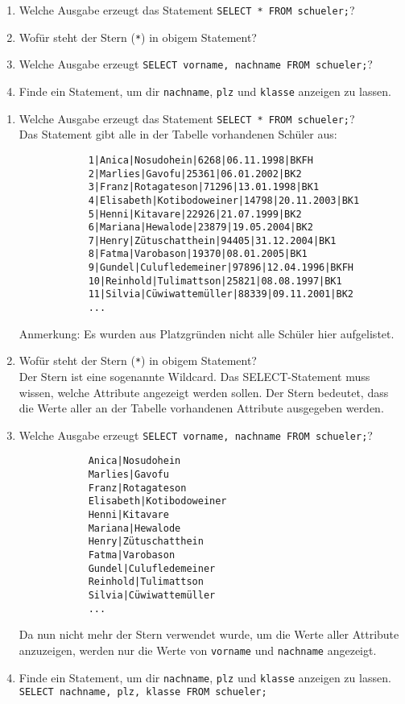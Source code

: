 \begin{Exercise}[title={Beantworte folgende Fragen mit Hilfe deiner Datenbank und dem Internet.}, label=Select]
	\begin{enumerate}
		\item Welche Ausgabe erzeugt das Statement \lstinline!SELECT * FROM schueler;!?
		\item Wofür steht der Stern (\lstinline!*!) in obigem Statement?
		\item Welche Ausgabe erzeugt \lstinline!SELECT vorname, nachname FROM schueler;!?
		\item Finde ein Statement, um dir \lstinline!nachname!, \lstinline!plz! und \lstinline!klasse! anzeigen zu lassen.
	\end{enumerate}
\end{Exercise}
\begin{Answer}[ref=Select]
	\begin{enumerate}
		\item Welche Ausgabe erzeugt das Statement \lstinline!SELECT * FROM schueler;!?\\
		Das Statement gibt alle in der Tabelle vorhandenen Schüler aus:\\
		\begin{lstlisting}
			1|Anica|Nosudohein|6268|06.11.1998|BKFH
			2|Marlies|Gavofu|25361|06.01.2002|BK2
			3|Franz|Rotagateson|71296|13.01.1998|BK1
			4|Elisabeth|Kotibodoweiner|14798|20.11.2003|BK1
			5|Henni|Kitavare|22926|21.07.1999|BK2
			6|Mariana|Hewalode|23879|19.05.2004|BK2
			7|Henry|Zütuschatthein|94405|31.12.2004|BK1
			8|Fatma|Varobason|19370|08.01.2005|BK1
			9|Gundel|Culufledemeiner|97896|12.04.1996|BKFH
			10|Reinhold|Tulimattson|25821|08.08.1997|BK1
			11|Silvia|Cüwiwattemüller|88339|09.11.2001|BK2
			...\end{lstlisting}
		Anmerkung: Es wurden aus Platzgründen nicht alle Schüler hier aufgelistet.
		\item Wofür steht der Stern (\lstinline!*!) in obigem Statement?\\
		Der Stern ist eine sogenannte Wildcard. Das SELECT-Statement muss wissen, welche Attribute angezeigt werden sollen. Der Stern bedeutet, dass die Werte aller an der Tabelle vorhandenen Attribute ausgegeben werden.
		\item Welche Ausgabe erzeugt \lstinline!SELECT vorname, nachname FROM schueler;!?
		\begin{lstlisting}
			Anica|Nosudohein
			Marlies|Gavofu
			Franz|Rotagateson
			Elisabeth|Kotibodoweiner
			Henni|Kitavare
			Mariana|Hewalode
			Henry|Zütuschatthein
			Fatma|Varobason
			Gundel|Culufledemeiner
			Reinhold|Tulimattson
			Silvia|Cüwiwattemüller
			...\end{lstlisting}
		Da nun nicht mehr der Stern verwendet wurde, um die Werte aller Attribute anzuzeigen, werden nur die Werte von \lstinline!vorname! und \lstinline!nachname! angezeigt.
		\item Finde ein Statement, um dir \lstinline!nachname!, \lstinline!plz! und \lstinline!klasse! anzeigen zu lassen.\\
		\lstinline!SELECT nachname, plz, klasse FROM schueler;!
	\end{enumerate}
\end{Answer}